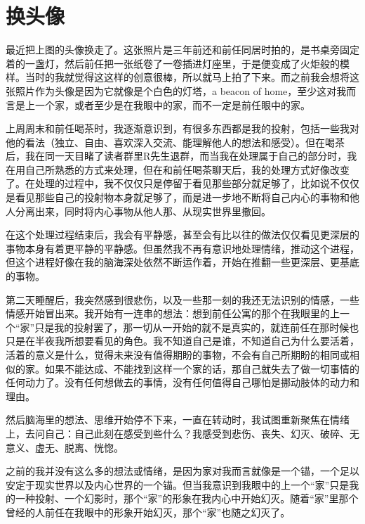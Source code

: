 \chapter{换头像}





最近把上图的头像换走了。这张照片是三年前还和前任同居时拍的，是书桌旁固定着的一盏灯，然后前任把一张纸卷了一卷插进灯座里，于是便变成了火炬般的模样。当时的我就觉得这这样的创意很棒，所以就马上拍了下来。而之前我会想将这张照片作为头像是因为它就像是个白色的灯塔，a beacon of home，至少这对我而言是上一个家，或者至少是在我眼中的家，而不一定是前任眼中的家。


上周周末和前任喝茶时，我逐渐意识到，有很多东西都是我的投射，包括一些我对他的看法（独立、自由、喜欢深入交流、能理解他人的想法和感受）。但在喝茶后，我在同一天目睹了读者群里R先生退群，而当我在处理属于自己的部分时，我在用自己所熟悉的方式来处理，但在和前任喝茶聊天后，我的处理方式好像改变了。在处理的过程中，我不仅仅只是停留于看见那些部分就足够了，比如说不仅仅是看见那些自己的投射物本身就足够了，而是进一步地不断将自己内心的事物和他人分离出来，同时将内心事物从他人那、从现实世界里撤回。

在这个处理过程结束后，我会有平静感，甚至会有比以往的做法\pozhehao{}仅仅看见更深层的事物本身\pozhehao{}有着更平静的平静感。但虽然我不再有意识地处理情绪，推动这个进程，但这个进程好像在我的脑海深处依然不断运作着，开始在推翻一些更深层、更基底的事物。

第二天睡醒后，我突然感到很悲伤，以及一些那一刻的我还无法识别的情感，一些情感开始冒出来。我开始有一连串的想法：想到前任公寓的那个在我眼里的上一个“家”只是我的投射罢了，那一切从一开始的就不是真实的，就连前任在那时候也只是在半夜我所想要看见的角色。我不知道自己是谁，不知道自己为什么要活着，活着的意义是什么，觉得未来没有值得期盼的事物，不会有自己所期盼的相同或相似的家。如果不能达成、不能找到这样一个家的话，那自己就失去了做一切事情的任何动力了。没有任何想做去的事情，没有任何值得自己哪怕是挪动肢体的动力和理由。

然后脑海里的想法、思维开始停不下来，一直在转动时，我试图重新聚焦在情绪上，去问自己：自己此刻在感受到些什么？我感受到悲伤、丧失、幻灭、破碎、无意义、虚无、脱离、恍惚。

之前的我并没有这么多的想法或情绪，是因为家对我而言就像是一个锚，一个足以安定于现实世界以及内心世界的一个锚。但当我意识到我眼中的上一个“家”只是我的一种投射、一个幻影时，那个“家”的形象在我内心中开始幻灭。随着“家”里那个曾经的人\pozhehao{}前任在我眼中的形象开始幻灭，那个“家”也随之幻灭了。

